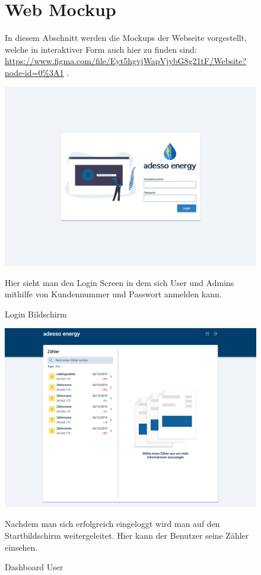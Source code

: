 
\newpage

\begin{figure}[h] 
	\newpage
	\section{Web Mockup}

	In diesem Abschnitt werden die Mockups der Webseite vorgestellt, welche in interaktiver Form auch hier zu finden sind:
	\url{https://www.figma.com/file/Eyt5hgvjWapVjybG8g21tF/Website?node-id=0%3A1} .

	\centering
    \includegraphics[scale=0.3]{img/WebsiteMockup/Login-User}
	\caption{Login Bildschirm} \hfill \break
	Hier sieht man den Login Screen in dem sich User und Admins mithilfe von Kundennummer und Passwort anmelden kann.
\end{figure}
 
\newpage

\begin{figure}[h]
	\centering
    \includegraphics[scale=0.3]{img/WebsiteMockup/Dashboard-User-NonSelected}
	\caption{Dashboard User} \hfill \break
	Nachdem man sich erfolgreich eingeloggt wird man auf den Startbildschirm weitergeleitet. Hier kann der Benutzer seine Zähler einsehen.
\end{figure}

